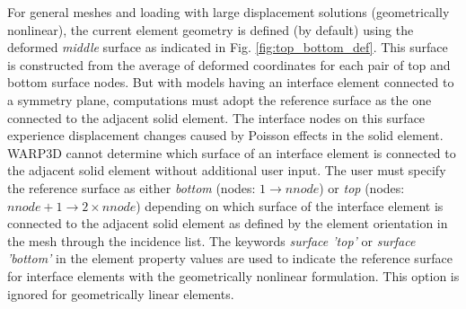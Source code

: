 \documentclass[11pt]{report}
\numberwithin{equation}{section}
\newcommand{\ti}{\emph}
\begin{document}
For general meshes and loading with large displacement solutions 
(geometrically nonlinear), the current element 
geometry is defined (by default) using the deformed \ti{middle} 
surface as indicated in Fig. \ref{fig:top_bottom_def}. This
surface is constructed from the
average of deformed coordinates for each pair of top and bottom surface
nodes. But with models having an interface element connected to
a symmetry plane, computations must adopt the 
reference surface as the one  
connected to the adjacent solid element. The interface nodes on 
this surface experience
displacement changes caused by Poisson effects in the solid 
element. WARP3D cannot determine which 
surface of an interface element is connected to the adjacent solid element
without additional user input. The user must specify the reference surface 
as either \ti{bottom} (nodes: $1 \rightarrow nnode$) or \ti{top }(nodes: 
$nnode+1 \rightarrow 2 \times nnode$) depending on which surface of the 
interface element is connected to the adjacent solid element as defined by the 
element orientation in the mesh through the incidence list. 
The keywords \ti{surface 'top'} or \ti{surface 'bottom'} in the element
property values are used to indicate the 
reference surface for interface elements with the geometrically nonlinear
formulation. This option is ignored for geometrically linear elements.
\end{document}
